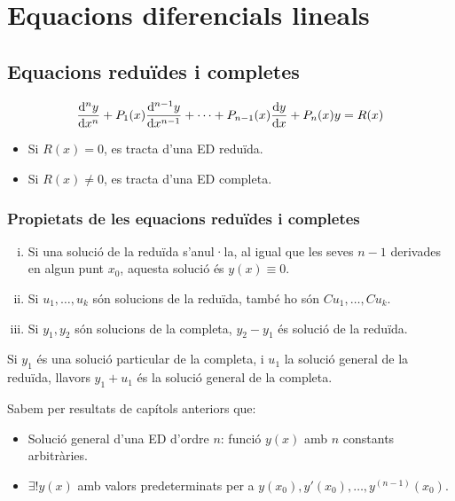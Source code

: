 \section{Equacions diferencials lineals}
\subsection{Equacions reduïdes i completes}
\begin{defi}
    \begin{align}\label{ed-lineal-n}
        \frac{\mathrm{d}^{n} y}{\mathrm{d} x^{n}} + P_{1}(x) \frac{\mathrm{d}^{n-1} y}{\mathrm{d} x^{n-1}} + \cdots + P_{n-1}(x) \frac{\mathrm{d} y}{\mathrm{d} x} + P_{n}(x) y = R(x)
	\end{align}
	\begin{itemize}
		\item Si $R(x) = 0$, es tracta d'una ED reduïda.
		\item Si $R(x) \neq 0$, es tracta d'una ED completa.
	\end{itemize}
\end{defi}

\subsubsection*{Propietats de les equacions reduïdes i completes}
\begin{enumerate}[i)]
    \item Si una solució de la reduïda s'anul·la, al igual que les seves $n-1$ derivades en algun punt $x_{0}$, aquesta solució és $y(x) \equiv 0$.
	\item Si $u_{1}, \dots , u_{k}$ són solucions de la reduïda, també ho són $Cu_{1}, \dots , Cu_{k}$.
	\item Si $y_{1}, y_{2}$ són solucions de la completa, $y_{2} - y_{1}$ és solució de la reduïda.
\end{enumerate}
\begin{cor}
    Si $y_{1}$ és una solució particular de la completa, i $u_{1}$ la solució general de la reduïda, llavors $y_{1} + u_{1}$ és la solució general de la completa.
\end{cor}
Sabem per resultats de capítols anteriors que:
\begin{itemize}
	\item Solució general d'una ED d'ordre $n$: funció $y(x)$ amb $n$ constants arbitràries.
	\item $\exists! y(x)$ amb valors predeterminats per a $y(x_{0}), y'(x_{0}), \dots , y^{(n-1)}(x_{0})$.
\end{itemize}

